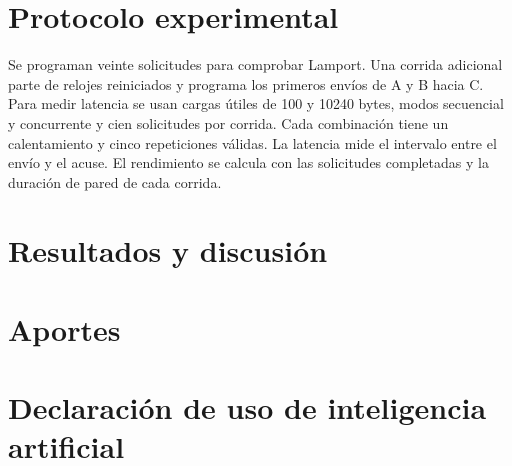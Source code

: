 \documentclass[11pt,a4paper]{article}
\begin{document}
\section{Protocolo experimental}
Se programan veinte solicitudes para comprobar Lamport. Una corrida adicional
parte de relojes reiniciados y programa los primeros envíos de A y B hacia C.
Para medir latencia se usan cargas útiles de 100 y 10240 bytes, modos
secuencial y concurrente y cien solicitudes por corrida. Cada combinación
tiene un calentamiento y cinco repeticiones válidas. La latencia mide el
intervalo entre el envío y el acuse. El rendimiento se calcula con las
solicitudes completadas y la duración de pared de cada corrida.

\section{Resultados y discusión}


\section{Aportes}

\section{Declaración de uso de inteligencia artificial}
\label{sec:declaracion-ia}
\end{document}
